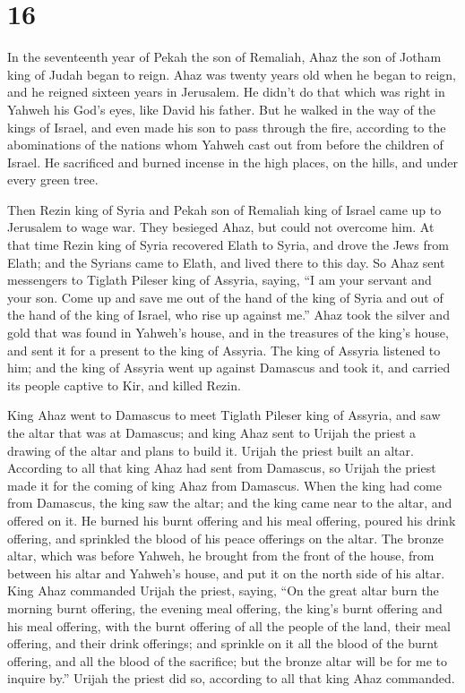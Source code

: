 \hypertarget{section-15}{%
\section{16}\label{section-15}}

 In the seventeenth year of Pekah the son of Remaliah,
Ahaz the son of Jotham king of Judah began to reign.  Ahaz
was twenty years old when he began to reign, and he reigned sixteen
years in Jerusalem. He didn't do that which was right in Yahweh his
God's eyes, like David his father.  But he walked in the
way of the kings of Israel, and even made his son to pass through the
fire, according to the abominations of the nations whom Yahweh cast out
from before the children of Israel.  He sacrificed and
burned incense in the high places, on the hills, and under every green
tree.

 Then Rezin king of Syria and Pekah son of Remaliah king
of Israel came up to Jerusalem to wage war. They besieged Ahaz, but
could not overcome him.  At that time Rezin king of Syria
recovered Elath to Syria, and drove the Jews from Elath; and the Syrians
came to Elath, and lived there to this day.  So Ahaz sent
messengers to Tiglath Pileser king of Assyria, saying, ``I am your
servant and your son. Come up and save me out of the hand of the king of
Syria and out of the hand of the king of Israel, who rise up against
me.''  Ahaz took the silver and gold that was found in
Yahweh's house, and in the treasures of the king's house, and sent it
for a present to the king of Assyria.  The king of Assyria
listened to him; and the king of Assyria went up against Damascus and
took it, and carried its people captive to Kir, and killed Rezin.

 King Ahaz went to Damascus to meet Tiglath Pileser king
of Assyria, and saw the altar that was at Damascus; and king Ahaz sent
to Urijah the priest a drawing of the altar and plans to build it.
 Urijah the priest built an altar. According to all that
king Ahaz had sent from Damascus, so Urijah the priest made it for the
coming of king Ahaz from Damascus.  When the king had
come from Damascus, the king saw the altar; and the king came near to
the altar, and offered on it.  He burned his burnt
offering and his meal offering, poured his drink offering, and sprinkled
the blood of his peace offerings on the altar.  The
bronze altar, which was before Yahweh, he brought from the front of the
house, from between his altar and Yahweh's house, and put it on the
north side of his altar.  King Ahaz commanded Urijah the
priest, saying, ``On the great altar burn the morning burnt offering,
the evening meal offering, the king's burnt offering and his meal
offering, with the burnt offering of all the people of the land, their
meal offering, and their drink offerings; and sprinkle on it all the
blood of the burnt offering, and all the blood of the sacrifice; but the
bronze altar will be for me to inquire by.''  Urijah the
priest did so, according to all that king Ahaz commanded.

